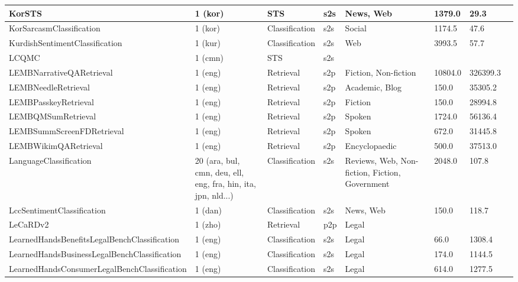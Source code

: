\begin{longtable}{L{5.0cm}|L{1.5cm}L{1.4cm}L{1.4cm}L{1.4cm}L{1.4cm}L{1.0cm}L{1.0cm}}
 \hline 
KorSTS \cite{ham2020kornli} & 1 (kor) & STS & s2s & News, Web & 1379.0 & 29.3 \\
 \hline 
KorSarcasmClassification \cite{kim2019kocasm} & 1 (kor) & Classification & s2s & Social & 1174.5 & 47.6 \\
 \hline 
KurdishSentimentClassification \cite{article} & 1 (kur) & Classification & s2s & Web & 3993.5 & 57.7 \\
 \hline 
LCQMC \cite{raghu-etal-2021-end} & 1 (cmn) & STS & s2s &  &  &  \\
 \hline 
LEMBNarrativeQARetrieval \cite{kocisky-etal-2018-narrativeqa} & 1 (eng) & Retrieval & s2p & Fiction, Non-fiction & 10804.0 & 326399.3 \\
 \hline 
LEMBNeedleRetrieval \cite{zhu2024longembed} & 1 (eng) & Retrieval & s2p & Academic, Blog & 150.0 & 35305.2 \\
 \hline 
LEMBPasskeyRetrieval \cite{zhu2024longembed} & 1 (eng) & Retrieval & s2p & Fiction & 150.0 & 28994.8 \\
 \hline 
LEMBQMSumRetrieval \cite{zhong-etal-2021-qmsum} & 1 (eng) & Retrieval & s2p & Spoken & 1724.0 & 56136.4 \\
 \hline 
LEMBSummScreenFDRetrieval \cite{chen-etal-2022-summscreen} & 1 (eng) & Retrieval & s2p & Spoken & 672.0 & 31445.8 \\
 \hline 
LEMBWikimQARetrieval \cite{ho2020constructing} & 1 (eng) & Retrieval & s2p & Encyclopaedic & 500.0 & 37513.0 \\
 \hline 
LanguageClassification \cite{conneau2018xnli} & 20 (ara, bul, cmn, deu, ell, eng, fra, hin, ita, jpn, nld...) & Classification & s2s & Reviews, Web, Non-fiction, Fiction, Government & 2048.0 & 107.8 \\
 \hline 
LccSentimentClassification \cite{quasthoff-etal-2006-corpus} & 1 (dan) & Classification & s2s & News, Web & 150.0 & 118.7 \\
 \hline 
LeCaRDv2 \cite{li2023lecardv2} & 1 (zho) & Retrieval & p2p & Legal &  &  \\
 \hline 
LearnedHandsBenefitsLegalBenchClassification \cite{guha2023legalbench} & 1 (eng) & Classification & s2s & Legal & 66.0 & 1308.4 \\
 \hline 
LearnedHandsBusinessLegalBenchClassification \cite{guha2023legalbench} & 1 (eng) & Classification & s2s & Legal & 174.0 & 1144.5 \\
 \hline 
LearnedHandsConsumerLegalBenchClassification \cite{guha2023legalbench} & 1 (eng) & Classification & s2s & Legal & 614.0 & 1277.5 \\

\end{longtable}
